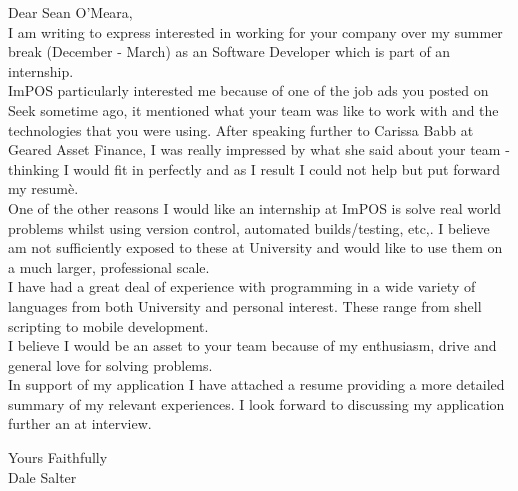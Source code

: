\noindent Dear Sean O'Meara, \\

\noindent I am writing to express interested in working for your company over my summer break (December - March) as an Software Developer which is part of an internship. \\

\noindent ImPOS particularly interested me because of one of the job ads you posted on Seek sometime ago, it mentioned what your team was like to work with
and the technologies that you were using. After speaking further to Carissa Babb at Geared Asset Finance, I was really impressed by what she said about your team - thinking I would fit in perfectly and as I result I could not help but put forward my resumè. \\

\noindent One of the other reasons I would like an internship at ImPOS is solve real world problems whilst using version control, automated builds/testing, etc,.
I believe am not sufficiently exposed to these at University and would like to use them on a much larger, professional scale. \\

\noindent I have had a great deal of experience with programming in a wide variety of languages from both University and personal interest.
These range from shell scripting to mobile development. \\

\noindent I believe I would be an asset to your team because of my enthusiasm, drive and general love for solving problems. \\

\noindent In support of my application I have attached a resume providing a more detailed summary of my relevant experiences. I look forward to discussing my application
further an at interview.

\vspace{10 mm}

\noindent Yours Faithfully \\

\noindent Dale Salter
